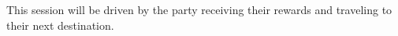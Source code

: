 This session will be driven by the party receiving their rewards and traveling to their next destination.
